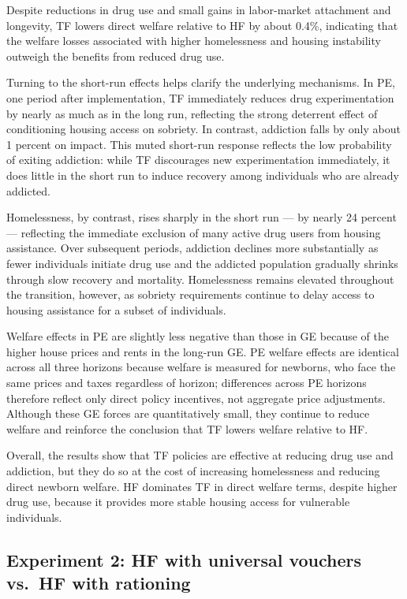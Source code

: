 \documentclass[parskip=full]{article}
\theoremstyle{plain}
\theoremstyle{definition}
\theoremstyle{remark}
\begin{document}
Despite reductions in drug use and small gains in labor-market attachment and longevity, TF lowers direct welfare relative to HF by about 0.4\%, indicating that the welfare losses associated with higher homelessness and housing instability outweigh the benefits from reduced drug use.

Turning to the short-run effects helps clarify the underlying mechanisms. In PE, one period after implementation, TF immediately reduces drug experimentation by nearly as much as in the long run, reflecting the strong deterrent effect of conditioning housing access on sobriety. In contrast, addiction falls by only about 1 percent on impact. This muted short-run response reflects the low probability of exiting addiction: while TF discourages new experimentation immediately, it does little in the short run to induce recovery among individuals who are already addicted.

Homelessness, by contrast, rises sharply in the short run — by nearly 24 percent — reflecting the immediate exclusion of many active drug users from housing assistance. Over subsequent periods, addiction declines more substantially as fewer individuals initiate drug use and the addicted population gradually shrinks through slow recovery and mortality. Homelessness remains elevated throughout the transition, however, as sobriety requirements continue to delay access to housing assistance for a subset of individuals.

Welfare effects in PE are slightly less negative than those in GE because of the higher house prices and rents in the long-run GE. PE welfare effects are identical across all three horizons because welfare is measured for newborns, who face the same prices and taxes regardless of horizon; differences across PE horizons therefore reflect only direct policy incentives, not aggregate price adjustments. Although these GE forces are quantitatively small, they continue to reduce welfare and reinforce the conclusion that TF lowers welfare relative to HF.

Overall, the results show that TF policies are effective at reducing drug use and addiction, but they do so at the cost of increasing homelessness and reducing direct newborn welfare. HF dominates TF in direct welfare terms, despite higher drug use, because it provides more stable housing access for vulnerable individuals.

\subsection{Experiment 2: HF with universal vouchers vs.\ HF with rationing}
\end{document}
